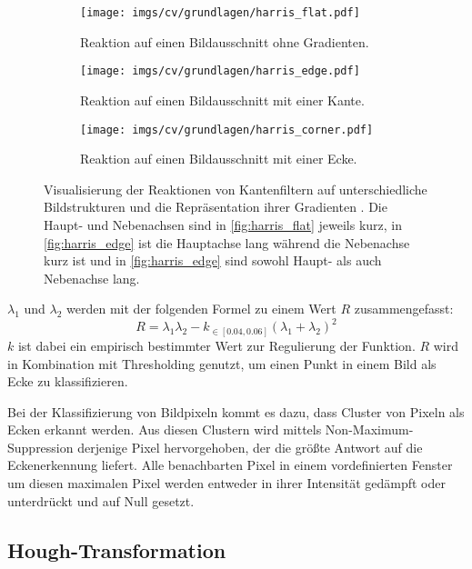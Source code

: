 \begin{figure}
    \centering
    \begin{subfigure}{0.3\textwidth}
        \centering
        \texttt{[image: imgs/cv/grundlagen/harris\_flat.pdf]}
        \caption{Reaktion auf einen Bildausschnitt ohne Gradienten.}
        \label{fig:harris_flat}
    \end{subfigure}
    \hfill
    \begin{subfigure}{0.3\textwidth}
        \centering
        \texttt{[image: imgs/cv/grundlagen/harris\_edge.pdf]}
        \caption{Reaktion auf einen Bildausschnitt mit einer Kante.}
        \label{fig:harris_edge}
    \end{subfigure}
    \hfill
    \begin{subfigure}{0.3\textwidth}
        \centering
        \texttt{[image: imgs/cv/grundlagen/harris\_corner.pdf]}
        \caption{Reaktion auf einen Bildausschnitt mit einer Ecke.}
        \label{fig:harris_corner}
    \end{subfigure}
    \caption{Visualisierung der Reaktionen von Kantenfiltern auf unterschiedliche Bildstrukturen und die Repräsentation ihrer Gradienten \cite{harris_visualization}. Die Haupt- und Nebenachsen sind in \autoref{fig:harris_flat} jeweils kurz, in \autoref{fig:harris_edge} ist die Hauptachse lang während die Nebenachse kurz ist und in \autoref{fig:harris_edge} sind sowohl Haupt- als auch Nebenachse lang.}
    \label{fig:harris}
\end{figure}

$\lambda_1$ und $\lambda_2$ werden mit der folgenden Formel zu einem Wert $R$ zusammengefasst:
\[ R = \lambda_1 \lambda_2 - k_{\in[0.04, 0.06]}(\lambda_1 + \lambda_2)^2 \]
$k$ ist dabei ein empirisch bestimmter Wert zur Regulierung der Funktion. $R$ wird in Kombination mit Thresholding genutzt, um einen Punkt in einem Bild als Ecke zu klassifizieren.

Bei der Klassifizierung von Bildpixeln kommt es dazu, dass Cluster von Pixeln als Ecken erkannt werden. Aus diesen Clustern wird mittels Non-Maximum-Suppression derjenige Pixel hervorgehoben, der die größte Antwort auf die Eckenerkennung liefert. Alle benachbarten Pixel in einem vordefinierten Fenster um diesen maximalen Pixel werden entweder in ihrer Intensität gedämpft oder unterdrückt und auf Null gesetzt.


\subsection{Hough-Transformation}
\label{sec:hough_transformation}

